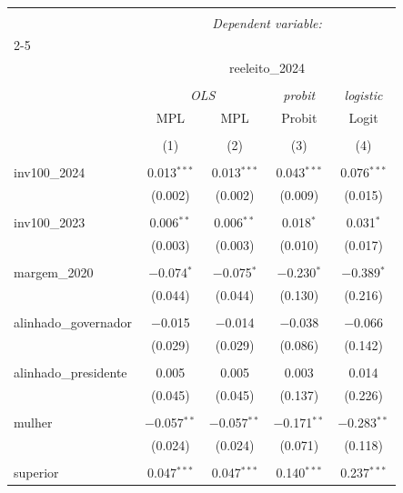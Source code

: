 
\begin{table}[!htbp] \centering 
  \caption{} 
  \label{} 
\begin{tabular}{@{\extracolsep{5pt}}lcccc} 
\\[-1.8ex]\hline 
\hline \\[-1.8ex] 
 & \multicolumn{4}{c}{\textit{Dependent variable:}} \\ 
\cline{2-5} 
\\[-1.8ex] & \multicolumn{4}{c}{reeleito\_2024} \\ 
\\[-1.8ex] & \multicolumn{2}{c}{\textit{OLS}} & \textit{probit} & \textit{logistic} \\ 
 & MPL & MPL & Probit & Logit \\ 
\\[-1.8ex] & (1) & (2) & (3) & (4)\\ 
\hline \\[-1.8ex] 
 inv100\_2024 & 0.013$^{***}$ & 0.013$^{***}$ & 0.043$^{***}$ & 0.076$^{***}$ \\ 
  & (0.002) & (0.002) & (0.009) & (0.015) \\ 
  & & & & \\ 
 inv100\_2023 & 0.006$^{**}$ & 0.006$^{**}$ & 0.018$^{*}$ & 0.031$^{*}$ \\ 
  & (0.003) & (0.003) & (0.010) & (0.017) \\ 
  & & & & \\ 
 margem\_2020 & $-$0.074$^{*}$ & $-$0.075$^{*}$ & $-$0.230$^{*}$ & $-$0.389$^{*}$ \\ 
  & (0.044) & (0.044) & (0.130) & (0.216) \\ 
  & & & & \\ 
 alinhado\_governador & $-$0.015 & $-$0.014 & $-$0.038 & $-$0.066 \\ 
  & (0.029) & (0.029) & (0.086) & (0.142) \\ 
  & & & & \\ 
 alinhado\_presidente & 0.005 & 0.005 & 0.003 & 0.014 \\ 
  & (0.045) & (0.045) & (0.137) & (0.226) \\ 
  & & & & \\ 
 mulher & $-$0.057$^{**}$ & $-$0.057$^{**}$ & $-$0.171$^{**}$ & $-$0.283$^{**}$ \\ 
  & (0.024) & (0.024) & (0.071) & (0.118) \\ 
  & & & & \\ 
 superior & 0.047$^{***}$ & 0.047$^{***}$ & 0.140$^{***}$ & 0.237$^{***}$ \\ 

\end{tabular}
\end{table}
